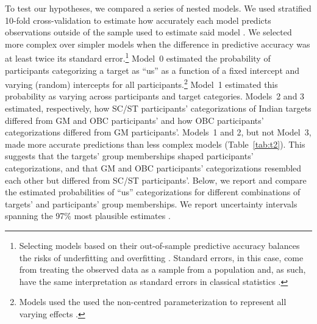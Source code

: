\documentclass[12pt, a4paper]{article}
\begin{document}
To test our hypotheses, we compared a series of nested models. We used stratified 10-fold cross-validation to estimate how accurately each model predicts observations outside of the sample used to estimate said model \cite{vehtari_practical_2017}. We selected more complex over simpler models when the difference in predictive accuracy was at least twice its standard error.\footnote{Selecting models based on their out-of-sample predictive accuracy balances the risks of underfitting and overfitting \cite<see also>{yarkoni_choosing_2017}. Standard errors, in this case, come from treating the observed data as a sample from a population and, as such, have the same interpretation as standard errors in classical statistics \cite{vehtari_practical_2017}.} Model~0 estimated the probability of participants categorizing a target as ``us'' as a function of a fixed intercept and varying (random) intercepts for all participants.\footnote{Models used the used the non-centred parameterization to represent all varying effects \cite{betancourt_hamilton_2015}.} Model~1 estimated this probability as varying across participants and target categories. Models~2 and 3 estimated, respectively, how SC/ST participants' categorizations of Indian targets differed from GM and OBC participants' and how OBC participants' categorizations differed from GM participants'. Models~1 and 2, but not Model~3, made more accurate predictions than less complex models (Table~\ref{tab:t2}). This suggests that the targets' group memberships shaped participants' categorizations, and that GM and OBC participants' categorizations resembled each other but differed from SC/ST participants'. Below, we report and compare the estimated probabilities of ``us'' categorizations for different combinations of targets' and participants' group memberships. We report uncertainty intervals spanning the 97\% most plausible estimates \cite{coda_package}.
\end{document}
